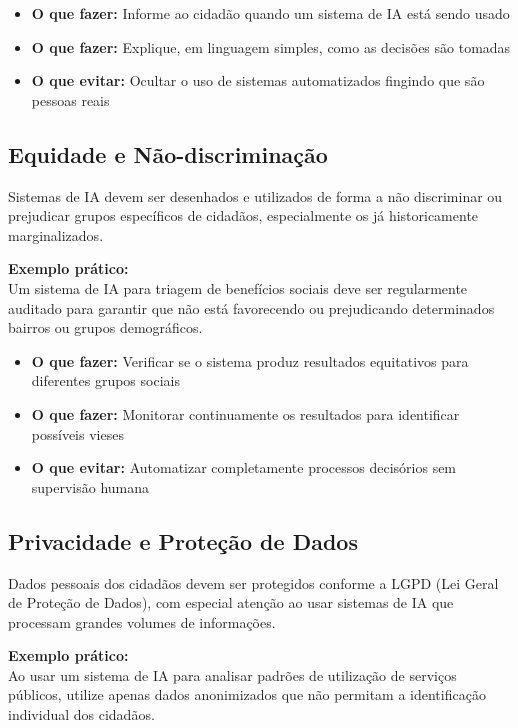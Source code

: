 \documentclass[12pt,a4paper]{article}
\begin{document}
\begin{itemize}
    \item \textbf{O que fazer:} Informe ao cidadão quando um sistema de IA está sendo usado
    \item \textbf{O que fazer:} Explique, em linguagem simples, como as decisões são tomadas
    \item \textbf{O que evitar:} Ocultar o uso de sistemas automatizados fingindo que são pessoas reais
\end{itemize}

\subsection{Equidade e Não-discriminação}
Sistemas de IA devem ser desenhados e utilizados de forma a não discriminar ou prejudicar grupos específicos de cidadãos, especialmente os já historicamente marginalizados.

\begin{tcolorbox}[example]
\textbf{Exemplo prático:} \\
Um sistema de IA para triagem de benefícios sociais deve ser regularmente auditado para garantir que não está favorecendo ou prejudicando determinados bairros ou grupos demográficos.
\end{tcolorbox}

\begin{itemize}
    \item \textbf{O que fazer:} Verificar se o sistema produz resultados equitativos para diferentes grupos sociais
    \item \textbf{O que fazer:} Monitorar continuamente os resultados para identificar possíveis vieses
    \item \textbf{O que evitar:} Automatizar completamente processos decisórios sem supervisão humana
\end{itemize}

\subsection{Privacidade e Proteção de Dados}
Dados pessoais dos cidadãos devem ser protegidos conforme a LGPD (Lei Geral de Proteção de Dados), com especial atenção ao usar sistemas de IA que processam grandes volumes de informações.

\begin{tcolorbox}[example]
\textbf{Exemplo prático:} \\
Ao usar um sistema de IA para analisar padrões de utilização de serviços públicos, utilize apenas dados anonimizados que não permitam a identificação individual dos cidadãos.
\end{tcolorbox}
\end{document}
